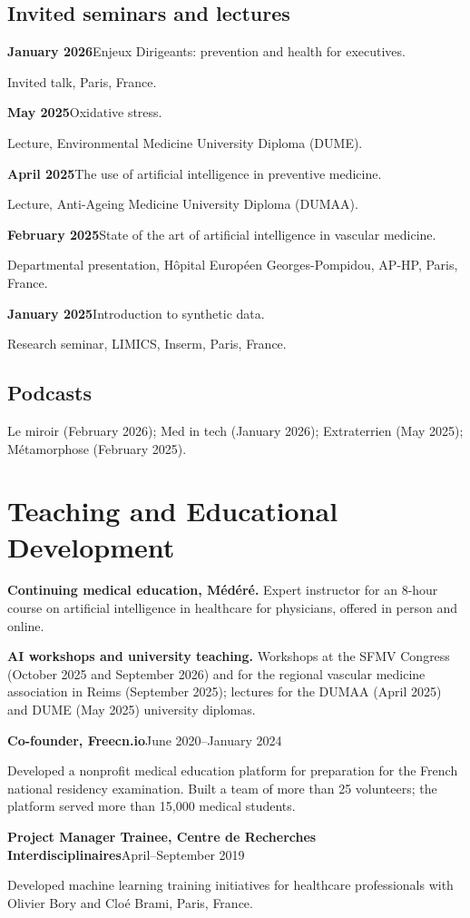 \documentclass[10pt,letterpaper]{article}
\newcommand{\entry}[2]{\par\vspace{5pt}\noindent\textbf{#1}\hfill{\sffamily\small\color{muted}#2}\par\vspace{1pt}}
\newcommand{\pres}[3]{\par\vspace{3pt}\noindent\textbf{#1}\quad #2\par{\small\color{muted}#3}\par}
\begin{document}
\subsection{Invited seminars and lectures}
\pres{January 2026}{Enjeux Dirigeants: prevention and health for executives.}{Invited talk, Paris, France.}
\pres{May 2025}{Oxidative stress.}{Lecture, Environmental Medicine University Diploma (DUME).}
\pres{April 2025}{The use of artificial intelligence in preventive medicine.}{Lecture, Anti-Ageing Medicine University Diploma (DUMAA).}
\pres{February 2025}{State of the art of artificial intelligence in vascular medicine.}{Departmental presentation, Hôpital Européen Georges-Pompidou, AP-HP, Paris, France.}
\pres{January 2025}{Introduction to synthetic data.}{Research seminar, LIMICS, Inserm, Paris, France.}

\subsection{Podcasts}
Le miroir (February 2026); Med in tech (January 2026); Extraterrien (May 2025); Métamorphose (February 2025).

\section{Teaching and Educational Development}
\textbf{Continuing medical education, Médéré.} Expert instructor for an 8-hour course on artificial intelligence in healthcare for physicians, offered in person and online.\par\vspace{4pt}
\textbf{AI workshops and university teaching.} Workshops at the SFMV Congress (October 2025 and September 2026) and for the regional vascular medicine association in Reims (September 2025); lectures for the DUMAA (April 2025) and DUME (May 2025) university diplomas.
\entry{Co-founder, Freecn.io}{June 2020--January 2024}
Developed a nonprofit medical education platform for preparation for the French national residency examination. Built a team of more than 25 volunteers; the platform served more than 15,000 medical students.
\entry{Project Manager Trainee, Centre de Recherches Interdisciplinaires}{April--September 2019}
Developed machine learning training initiatives for healthcare professionals with Olivier Bory and Cloé Brami, Paris, France.
\end{document}

